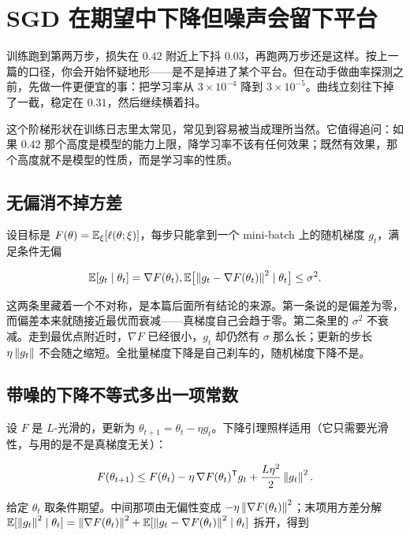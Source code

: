 \section{SGD 在期望中下降但噪声会留下平台}
\label{sec:09-Convex-Optimization/08-Nonconvex-and-Stochastic-Optimization/04}

训练跑到第两万步，损失在 \(0.42\) 附近上下抖 \(0.03\)，再跑两万步还是这样。按上一篇的口径，你会开始怀疑地形——是不是掉进了某个平台。但在动手做曲率探测之前，先做一件更便宜的事：把学习率从 \(3\times10^{-4}\) 降到 \(3\times10^{-5}\)。曲线立刻往下掉了一截，稳定在 \(0.31\)，然后继续横着抖。

这个阶梯形状在训练日志里太常见，常见到容易被当成理所当然。它值得追问：如果 \(0.42\) 那个高度是模型的能力上限，降学习率不该有任何效果；既然有效果，那个高度就不是模型的性质，而是学习率的性质。

\subsection{无偏消不掉方差}

设目标是 \(F(\theta)=\mathbb{E}_\xi[\ell(\theta;\xi)]\)，每步只能拿到一个 mini-batch 上的随机梯度 \(g_t\)，满足条件无偏

\[
\mathbb{E}[g_t\mid\theta_t]=\nabla F(\theta_t),\space
\mathbb{E}\bigl[\left\lVert g_t-\nabla F(\theta_t)\right\rVert^2\mid\theta_t\bigr]\le\sigma^2 .
\]

这两条里藏着一个不对称，是本篇后面所有结论的来源。第一条说的是偏差为零，而偏差本来就随接近最优而衰减——真梯度自己会趋于零。第二条里的 \(\sigma^2\) 不衰减。走到最优点附近时，\(\nabla F\) 已经很小，\(g_t\) 却仍然有 \(\sigma\) 那么长；更新的步长 \(\eta\left\lVert g_t\right\rVert\) 不会随之缩短。全批量梯度下降是自己刹车的，随机梯度下降不是。

\subsection{带噪的下降不等式多出一项常数}

设 \(F\) 是 \(L\)-光滑的，更新为 \(\theta_{t+1}=\theta_t-\eta g_t\)。下降引理照样适用（它只需要光滑性，与用的是不是真梯度无关）：

\[
F(\theta_{t+1})\le F(\theta_t)-\eta\,\nabla F(\theta_t)^{\mathsf{T}}g_t+\frac{L\eta^2}{2}\left\lVert g_t\right\rVert^2 .
\]

给定 \(\theta_t\) 取条件期望。中间那项由无偏性变成 \(-\eta\left\lVert\nabla F(\theta_t)\right\rVert^2\)；末项用方差分解 \(\mathbb{E}[\left\lVert g_t\right\rVert^2\mid\theta_t]=\left\lVert\nabla F(\theta_t)\right\rVert^2+\mathbb{E}[\left\lVert g_t-\nabla F(\theta_t)\right\rVert^2\mid\theta_t]\) 拆开，得到

